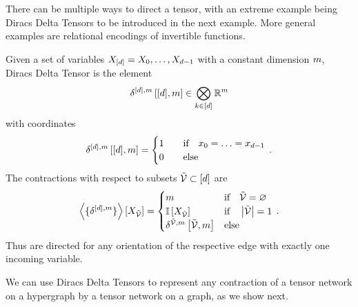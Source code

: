 There can be multiple ways to direct a tensor, with an extreme example being Diracs Delta Tensors to be introduced in the next example.
More general examples are relational encodings of invertible functions.

\begin{example}
    Given a set of variables $X_{[d]}=X_{0},\ldots,X_{d-1}$ with a constant dimension $m$, Diracs Delta Tensor is the element
    \begin{align*}
        \delta^{[d],m}\left[[d],m\right] \in \bigotimes_{k\in[d]} \mathbb{R}^{m}
    \end{align*}
    with coordinates
    \begin{align}
        \delta^{[d],m}\left[[d],m\right] =
        \begin{cases}
            1 \quad & \text{if} \quad x_{0} = \ldots = x_{d-1} \\
            0 & \text{else}
        \end{cases} \, .
    \end{align}
    The contractions with respect to subsets $\tilde{\mathcal{V}}\subset[d]$ are
    \begin{align}
        \left\langle \{\delta^{[d],m}\}\right\rangle \left[ X_{\tilde{\mathcal{V}}} \right] =
        \begin{cases}
            m & \text{if} \quad \tilde{\mathcal{V}} = \varnothing \\
            \mathbb{I}\left[X_{\tilde{\mathcal{V}}}\right] & \text{if} \quad \left|\tilde{\mathcal{V}}\right| = 1\\
            \delta^{\tilde{\mathcal{V}},m}\left[\tilde{\mathcal{V}},m\right] & \text{else}
        \end{cases} \, .
    \end{align}
    Thus are directed for any orientation of the respective edge with exactly one incoming variable.
\end{example}

We can use Diracs Delta Tensors to represent any contraction of a tensor network on a hypergraph by a tensor network on a graph, as we show next.

